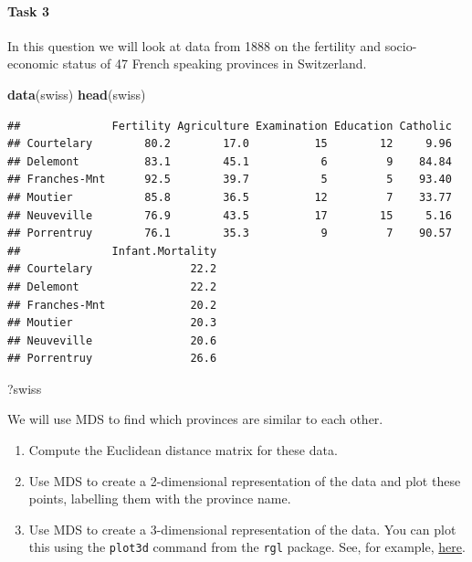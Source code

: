 \documentclass[]{book}
\newenvironment{Shaded}{\begin{snugshade}}{\end{snugshade}}
\newcommand{\KeywordTok}[1]{\textcolor[rgb]{0.13,0.29,0.53}{\textbf{#1}}}
\newcommand{\NormalTok}[1]{#1}
\let\oldparagraph\paragraph
\renewcommand{\paragraph}[1]{\oldparagraph{#1}\mbox{}}
\theoremstyle{definition}
\theoremstyle{definition}
\theoremstyle{definition}
\theoremstyle{remark}
\begin{document}
\hypertarget{task-3-1}{%
\paragraph{Task 3}\label{task-3-1}}

In this question we will look at data from 1888 on the fertility and socio-economic status of 47 French speaking provinces in Switzerland.

\begin{Shaded}
\begin{Highlighting}[]
\KeywordTok{data}\NormalTok{(swiss)}
\KeywordTok{head}\NormalTok{(swiss)}
\end{Highlighting}
\end{Shaded}

\begin{verbatim}
##              Fertility Agriculture Examination Education Catholic
## Courtelary        80.2        17.0          15        12     9.96
## Delemont          83.1        45.1           6         9    84.84
## Franches-Mnt      92.5        39.7           5         5    93.40
## Moutier           85.8        36.5          12         7    33.77
## Neuveville        76.9        43.5          17        15     5.16
## Porrentruy        76.1        35.3           9         7    90.57
##              Infant.Mortality
## Courtelary               22.2
## Delemont                 22.2
## Franches-Mnt             20.2
## Moutier                  20.3
## Neuveville               20.6
## Porrentruy               26.6
\end{verbatim}

\begin{Shaded}
\begin{Highlighting}[]
\NormalTok{?swiss}
\end{Highlighting}
\end{Shaded}

We will use MDS to find which provinces are similar to each other.

\begin{enumerate}
\def\labelenumi{\roman{enumi}.}
\item
  Compute the Euclidean distance matrix for these data.
\item
  Use MDS to create a 2-dimensional representation of the data and plot these points, labelling them with the province name.
\item
  Use MDS to create a 3-dimensional representation of the data. You can plot this using the \texttt{plot3d} command from the \texttt{rgl} package. See, for example, \href{https://rpubs.com/aagarwal29/179912}{here}.
\end{enumerate}
\end{document}
